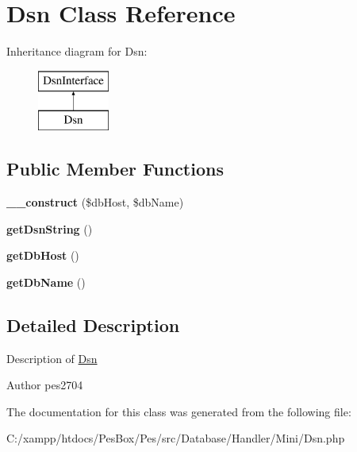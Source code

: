 \hypertarget{class_pes_1_1_database_1_1_handler_1_1_mini_1_1_dsn}{}\section{Dsn Class Reference}
\label{class_pes_1_1_database_1_1_handler_1_1_mini_1_1_dsn}
Inheritance diagram for Dsn\+:\begin{figure}[H]
\begin{center}
\leavevmode
\includegraphics[height=2.000000cm]{class_pes_1_1_database_1_1_handler_1_1_mini_1_1_dsn}
\end{center}
\end{figure}
\subsection*{Public Member Functions}
\begin{DoxyCompactItemize}
\item 
\mbox{\label{class_pes_1_1_database_1_1_handler_1_1_mini_1_1_dsn_a9762bb638b195ccf2fbd544b189375eb}} 
{\bfseries \+\_\+\+\_\+construct} (\$db\+Host, \$db\+Name)
\item 
\mbox{\label{class_pes_1_1_database_1_1_handler_1_1_mini_1_1_dsn_a0709987536a81514c569d8ff4131c283}} 
{\bfseries get\+Dsn\+String} ()
\item 
\mbox{\label{class_pes_1_1_database_1_1_handler_1_1_mini_1_1_dsn_ad855d2dfa322f4566b89fcc00fd0e282}} 
{\bfseries get\+Db\+Host} ()
\item 
\mbox{\label{class_pes_1_1_database_1_1_handler_1_1_mini_1_1_dsn_a4949c3e4d80c0d275c80e0c1c3b5b280}} 
{\bfseries get\+Db\+Name} ()
\end{DoxyCompactItemize}


\subsection{Detailed Description}
Description of \mbox{\hyperlink{class_pes_1_1_database_1_1_handler_1_1_mini_1_1_dsn}{Dsn}}

\begin{DoxyAuthor}{Author}
pes2704 
\end{DoxyAuthor}


The documentation for this class was generated from the following file\+:\begin{DoxyCompactItemize}
\item 
C\+:/xampp/htdocs/\+Pes\+Box/\+Pes/src/\+Database/\+Handler/\+Mini/Dsn.\+php\end{DoxyCompactItemize}
